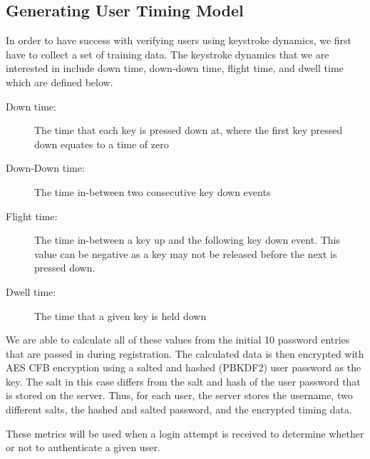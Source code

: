 \documentclass{article}
\begin{document}
\subsection{Generating User Timing Model}
In order to have success with verifying users using keystroke dynamics, we first have to collect a set of training data. The keystroke dynamics that we are interested in include down time, down-down time, flight time, and dwell time which are defined below. 
\begin{description}
	\item[Down time:] The time that each key is pressed down at, where the first key pressed down equates to a time of zero
	\item[Down-Down time:] The time in-between two consecutive key down events
	\item[Flight time:] The time in-between a key up and the following key down event. This value can be negative as a key may not be released before the next is pressed down. 
	\item[Dwell time:] The time that a given key is held down
\end{description}
We are able to calculate all of these values from the initial 10 password entries that are passed in during registration. The calculated data is then encrypted with AES CFB encryption using a salted and hashed (PBKDF2) user password as the key. The salt in this case differs from the salt and hash of the user password that is stored on the server. Thus, for each user, the server stores the username, two different salts, the hashed and salted password, and the encrypted timing data.

These metrics will be used when a login attempt is received to determine whether or not to authenticate a given user.
\end{document}
